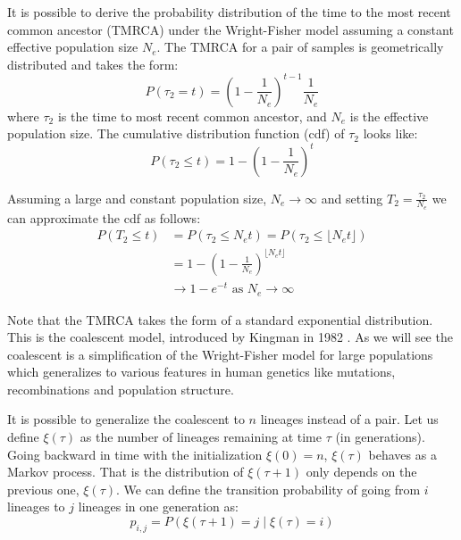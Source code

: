It is possible to derive the probability distribution of the time to the most recent common ancestor (TMRCA) under the Wright-Fisher model assuming a constant effective population size $N_e$. The TMRCA for a pair of samples is geometrically distributed and takes the form:
\begin{equation}
P(\tau_2 = t) = \left(1 - \frac{1}{N_e}\right)^{t-1} \frac{1}{N_e}
\end{equation}
where $\tau_2$ is the time to most recent common ancestor, and $N_e$ is the effective population size. The cumulative distribution function (cdf) of $\tau_2$ looks like:
\begin{equation}
P(\tau_2 \leq t) = 1 - \left(1 - \frac{1}{N_e}\right)^{t}
\end{equation}

Assuming a large and constant population size, $N_e \rightarrow \infty$ and setting $T_2 = \frac{\tau_2}{N_e}$ we can approximate the cdf as follows:
\begin{equation}
\begin{aligned}
    P(T_2 \leq t) &= P(\tau_2 \leq N_et) = P(\tau_2 \leq \lfloor N_et \rfloor) \\
    &= 1 - \left(1 - \frac{1}{N_e}\right)^{\lfloor N_et \rfloor} \\
    & \rightarrow 1 - e^{-t} \text{  as  } N_e \rightarrow \infty
\end{aligned}
\end{equation}

Note that the TMRCA takes the form of a standard exponential distribution. This is the coalescent model, introduced by Kingman in 1982 \cite{kingman1982coalescent, Kingman1982b, Kingman1982c}. As we will see the coalescent is a simplification of the Wright-Fisher model \cite{Wright1931, Fisher1930} for large populations which generalizes to various features in human genetics like mutations, recombinations and population structure. 

It is possible to generalize the coalescent to \(n\) lineages instead of a pair. Let us define $\xi(\tau)$ as the number of lineages remaining at time $\tau$ (in generations). Going backward in time with the initialization $\xi(0) = n$, $\xi(\tau)$ behaves as a Markov process. That is the distribution of $\xi(\tau + 1)$ only depends on the previous one, $\xi(\tau)$. We can define the transition probability of going from $i$ lineages to $j$ lineages in one generation as:
\begin{equation}
    p_{i,j} = P(\xi(\tau + 1) = j \mid \xi(\tau) = i)
\end{equation}


